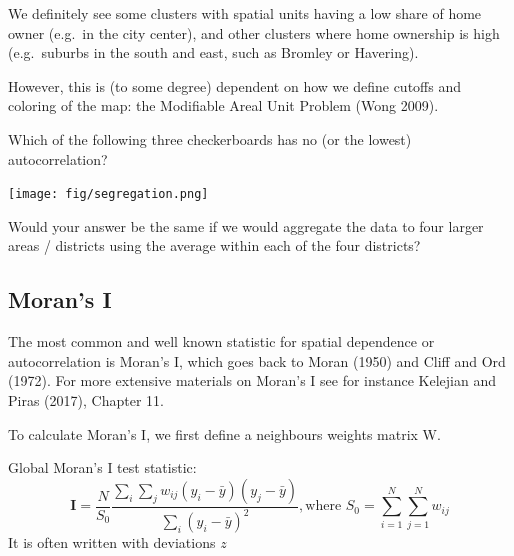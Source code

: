 \documentclass[
  letterpaper,
  DIV=11,
  numbers=noendperiod]{scrreprt}
\begin{document}
We definitely see some clusters with spatial units having a low share of
home owner (e.g.~in the city center), and other clusters where home
ownership is high (e.g.~suburbs in the south and east, such as Bromley
or Havering).

However, this is (to some degree) dependent on how we define cutoffs and
coloring of the map: the Modifiable Areal Unit Problem (Wong 2009).

\begin{tcolorbox}[enhanced jigsaw, opacitybacktitle=0.6, left=2mm, leftrule=.75mm, toptitle=1mm, breakable, colback=white, bottomrule=.15mm, colframe=quarto-callout-tip-color-frame, colbacktitle=quarto-callout-tip-color!10!white, coltitle=black, bottomtitle=1mm, titlerule=0mm, title=\textcolor{quarto-callout-tip-color}{\faLightbulb}\hspace{0.5em}{Question}, opacityback=0, arc=.35mm, rightrule=.15mm, toprule=.15mm]

Which of the following three checkerboards has no (or the lowest)
autocorrelation?

\end{tcolorbox}

\texttt{[image: fig/segregation.png]}

Would your answer be the same if we would aggregate the data to four
larger areas / districts using the average within each of the four
districts?

\hypertarget{morans-i}{%
\subsection{Moran's I}\label{morans-i}}

The most common and well known statistic for spatial dependence or
autocorrelation is Moran's I, which goes back to Moran (1950) and Cliff
and Ord (1972). For more extensive materials on Moran's I see for
instance Kelejian and Piras (2017), Chapter 11.

To calculate Moran's I, we first define a neighbours weights matrix W.

Global Moran's I test statistic: \[      
        \begin{equation} 
        \boldsymbol{\mathbf{I}}  = \frac{N}{S_0}  
        \frac{\sum_i\sum_j w_{ij}(y_i-\bar{y})(y_j-\bar{y})}
            {\sum_i (y_i-\bar{y})^2}, \text{where } S_0 = \sum_{i=1}^N\sum_{j=1}^N w_{ij}
        \end{equation}
\] It is often written with deviations \(z\)
\end{document}
